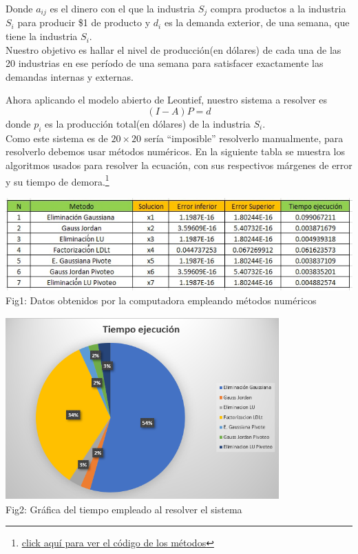 \documentclass[10pt,a4paper]{article}
\begin{document}
\begin{multicols}{2}
\noindent Donde $a_{ij}$ es el dinero con el que la industria $S_j$ compra productos a la industria $S_i$ para producir \$1 de producto y $d_i$ es la demanda exterior, de una semana, que tiene la industria $S_i$.\\
Nuestro objetivo es hallar el nivel de producción(en dólares) de cada una de las 20 industrias en ese período de una semana para satisfacer exactamente las demandas internas y externas.

\noindent Ahora aplicando el modelo abierto de Leontief, nuestro sistema a resolver es $$(I-A)P=d$$ donde $p_i$ es la producción total(en dólares) de la industria $S_i$.\\
Como este sistema es de $20\times20$ sería ``imposible'' resolverlo manualmente, para resolverlo debemos usar métodos numéricos. En la siguiente tabla se muestra los algoritmos usados para resolver la ecuación, con sus respectivos márgenes de error y su tiempo de demora.\footnote{\href{https://drive.google.com/drive/folders/1F-M1slvs1ibC-nhFcPin_ge0fLCHVb1c?usp=sharing}{\underline{click aquí para ver el código de los métodos}}}
\end{multicols}
\vspace*{1cm}

\begin{center}
	\centering
	\includegraphics[scale=0.8]{TablasDatos.jpg}
	\\
	Fig1: Datos obtenidos por la computadora empleando métodos numéricos 
\end{center}

\vspace*{1cm}

\begin{center}
	\centering
	\includegraphics[width=10.5cm,height=7cm]{TiempoEjecucion.PNG}
	\\
	Fig2: Gráfica del tiempo empleado al resolver el sistema
	 
\end{center}
\end{document}
